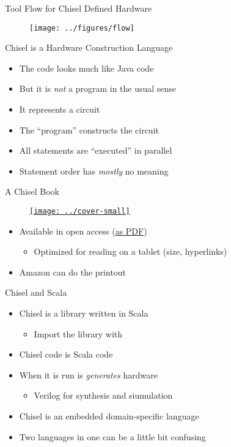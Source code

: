 \begin{frame}[fragile]{Tool Flow for Chisel Defined Hardware}
\begin{figure}
    \centering
    \texttt{[image: ../figures/flow]}
\end{figure}
\end{frame}

\begin{frame}[fragile]{Chisel is a Hardware Construction Language}
\begin{itemize}
\item The code looks much like Java code
\item But it is \emph{not} a program in the usual sense
\item It represents a circuit
\item The ``program'' constructs the circuit
\item All statements are ``executed'' in parallel
\item Statement order has \emph{mostly} no meaning
\end{itemize}
\end{frame}

\begin{frame}[fragile]{A Chisel Book}
\begin{figure}
    \centering
    \href{https://github.com/schoeberl/chisel-book}{\texttt{[image: ../cover-small]}}
\end{figure}

\begin{itemize}
\item Available in open access (\href{https://www.imm.dtu.dk/~masca/chisel-book.pdf}{as PDF})
\begin{itemize}
\item Optimized for reading on a tablet (size, hyperlinks)
\end{itemize}
\item Amazon can do the printout
\end{itemize}
\end{frame}



\begin{frame}[fragile]{Chisel and Scala}
\begin{itemize}
\item Chisel is a library written in Scala
\begin{itemize}
\item Import the library with 
\end{itemize}
\item Chisel code is Scala code
\item When it is run is \emph{generates} hardware
\begin{itemize}
\item Verilog for synthesis and siumulation
\end{itemize}
\item Chisel is an embedded domain-specific language
\item Two languages in one can be a little bit confusing
\end{itemize}
\end{frame}


